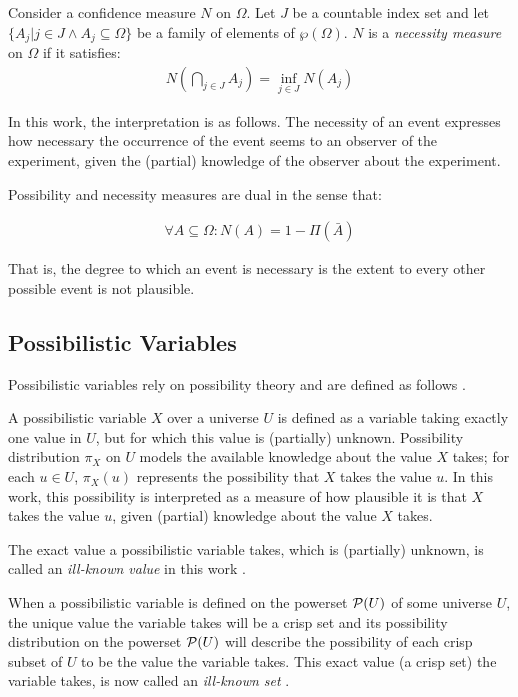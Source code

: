 \begin{definition}
Consider a confidence measure $N$ on $\Omega$. Let $J$ be a countable index set and let $\{ A_{j} | j \in J \wedge A_{j} \subseteq \Omega \}$ be a family of elements of $\wp(\Omega)$. $N$ is a \emph{necessity measure} on $\Omega$ if it satisfies:
	\begin{align}
	N\left(\bigcap_{j \in J} A_{j} \right) = \inf_{j \in J} N(A_{j})
	\end{align}
\end{definition}

In this work, the interpretation is as follows. The necessity of an event expresses how necessary the occurrence of the event seems to an observer of the experiment, given the (partial) knowledge of the observer about the experiment.

Possibility and necessity measures are dual in the sense that:

\begin{align}
\forall A \subseteq \Omega : N(A) = 1 - \Pi(\bar{A})
\end{align}

That is, the degree to which an event is necessary is the extent to every other possible event is not plausible.

\subsection{\label{subsec:possibilistic-variables}Possibilistic Variables}
Possibilistic variables rely on possibility theory \cite{Dubois1988a} and are defined as follows \cite{Pons2011}.

\begin{definition}
\label{def;possibilistic-variable}
A possibilistic variable $X$ over a universe $U$ is defined as a variable taking exactly one value in $U$, but for which this value is (partially) unknown. Possibility distribution $\pi_X$ on $U$ models the available knowledge about the value $X$ takes; for each $u\in U$, $\pi_X(u)$ represents the possibility that $X$ takes the value $u$. In this work, this possibility is interpreted as a measure of how plausible it is that $X$ takes the value $u$, given (partial) knowledge about the value $X$ takes.
\end{definition}

The exact value a possibilistic variable takes, which is (partially) unknown, is called an \emph{ill-known value} in this work \cite{Dubois1988a}.

When a possibilistic variable is defined on the powerset $\mathcal{P}(U)$ of some universe $U$, the unique value the variable takes will be a crisp set and its possibility distribution on the powerset $\mathcal{P}(U)$ will describe the possibility of each crisp subset of $U$ to be the value the variable takes. This exact value (a crisp set) the variable takes, is now called an \emph{ill-known set} \cite{Dubois1988a}.

